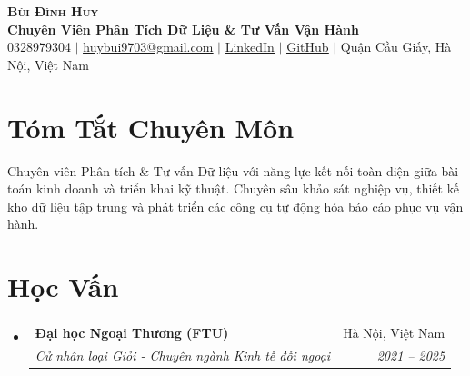 \documentclass[letterpaper,11pt]{article}
\makeatletter
\newcommand{\resumeSubheading}[4]{
  \vspace{2pt}\item
    \begin{tabular*}{\textwidth}[t]{l@{\extracolsep{\fill}}r}
      \textbf{#1} & #2 \\
      \textit{\small#3} & \textit{\small #4} \\
    \end{tabular*}\vspace{-2pt}
}
\newcommand{\resumeSubHeadingListStart}{\begin{itemize}[leftmargin=0.15in, label={}]}
\newcommand{\resumeSubHeadingListEnd}{\end{itemize}}
\makeatother
\begin{document}
\begin{center}
    \textbf{\Huge \scshape Bùi Đình Huy} \\ \vspace{3pt}
    \small \textbf{\color{NavyBlue} Chuyên Viên Phân Tích Dữ Liệu \& Tư Vấn Vận Hành} \\ \vspace{4pt}
    \small 0328979304 $|$ \href{mailto:huybui9703@gmail.com}{\underline{huybui9703@gmail.com}} $|$ 
    \href{https://www.linkedin.com/in/dinh-huy-bui/}{\underline{LinkedIn}} $|$
    \href{https://github.com/dinhhuybui}{\underline{GitHub}} $|$
    Quận Cầu Giấy, Hà Nội, Việt Nam
\end{center}

\vspace{2pt}

\section*{Tóm Tắt Chuyên Môn}
\small{Chuyên viên Phân tích \& Tư vấn Dữ liệu với năng lực kết nối toàn diện giữa bài toán kinh doanh và triển khai kỹ thuật. Chuyên sâu khảo sát nghiệp vụ, thiết kế kho dữ liệu tập trung và phát triển các công cụ tự động hóa báo cáo phục vụ vận hành.}

\section*{Học Vấn}
  \resumeSubHeadingListStart
    \resumeSubheading
      {Đại học Ngoại Thương (FTU)}{Hà Nội, Việt Nam}
      {Cử nhân loại Giỏi - Chuyên ngành Kinh tế đối ngoại}{2021 -- 2025}
  \resumeSubHeadingListEnd

\end{document}

